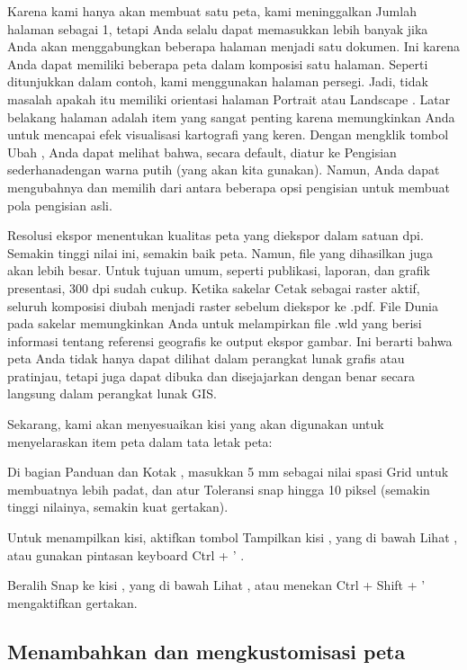 \documentclass[]{book}
\begin{document}
Karena kami hanya akan membuat satu peta, kami meninggalkan Jumlah halaman sebagai 1, tetapi Anda selalu dapat memasukkan lebih banyak jika Anda akan menggabungkan beberapa halaman menjadi satu dokumen. Ini karena Anda dapat memiliki beberapa peta dalam komposisi satu halaman. Seperti ditunjukkan dalam contoh, kami menggunakan halaman persegi. Jadi, tidak masalah apakah itu memiliki orientasi halaman Portrait atau Landscape . Latar belakang halaman adalah item yang sangat penting karena memungkinkan Anda untuk mencapai efek visualisasi kartografi yang keren. Dengan mengklik tombol Ubah , Anda dapat melihat bahwa, secara default, diatur ke Pengisian sederhanadengan warna putih (yang akan kita gunakan). Namun, Anda dapat mengubahnya dan memilih dari antara beberapa opsi pengisian untuk membuat pola pengisian asli.

Resolusi ekspor menentukan kualitas peta yang diekspor dalam satuan dpi. Semakin tinggi nilai ini, semakin baik peta. Namun, file yang dihasilkan juga akan lebih besar. Untuk tujuan umum, seperti publikasi, laporan, dan grafik presentasi, 300 dpi sudah cukup. Ketika sakelar Cetak sebagai raster aktif, seluruh komposisi diubah menjadi raster sebelum diekspor ke .pdf. File Dunia pada sakelar memungkinkan Anda untuk melampirkan file .wld yang berisi informasi tentang referensi geografis ke output ekspor gambar. Ini berarti bahwa peta Anda tidak hanya dapat dilihat dalam perangkat lunak grafis atau pratinjau, tetapi juga dapat dibuka dan disejajarkan dengan benar secara langsung dalam perangkat lunak GIS.

Sekarang, kami akan menyesuaikan kisi yang akan digunakan untuk menyelaraskan item peta dalam tata letak peta:

Di bagian Panduan dan Kotak , masukkan 5 mm sebagai nilai spasi Grid untuk membuatnya lebih padat, dan atur Toleransi snap hingga 10 piksel (semakin tinggi nilainya, semakin kuat gertakan).

Untuk menampilkan kisi, aktifkan tombol Tampilkan kisi , yang di bawah Lihat , atau gunakan pintasan keyboard Ctrl + ' .

Beralih Snap ke kisi , yang di bawah Lihat , atau menekan Ctrl + Shift + ' mengaktifkan gertakan.

\hypertarget{menambahkan-dan-mengkustomisasi-peta}{%
\subsection{Menambahkan dan mengkustomisasi peta}\label{menambahkan-dan-mengkustomisasi-peta}}
\end{document}

